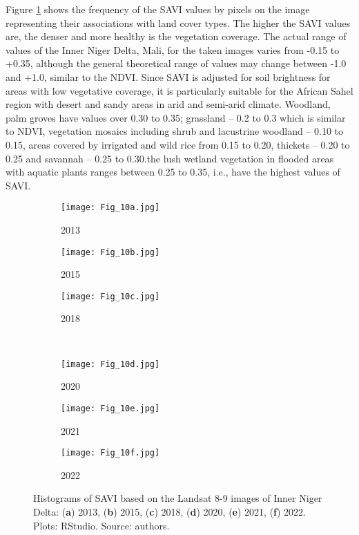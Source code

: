 \documentclass[12pt,a4paper,oneside]{article}
\def \newpar{\vspace{6pt}}
\begin{document}
\newpar Figure \ref{fig10} shows the frequency of the SAVI values by pixels on the image representing their associations with land cover types. The higher the SAVI values are, the denser and more healthy is the vegetation coverage. The actual range of values of the Inner Niger Delta, Mali, for the taken images varies from -0.15 to +0.35, although the general theoretical range of values may change between -1.0 and +1.0, similar to the NDVI. Since SAVI is adjusted for soil brightness for areas with low vegetative coverage, it is particularly suitable for the African Sahel region with desert and sandy areas in arid and semi-arid climate. Woodland, palm groves have values over 0.30 to 0.35; grassland -- 0.2 to 0.3 which is similar to NDVI, vegetation mosaics including shrub and lacustrine woodland -- 0.10 to 0.15, areas covered by irrigated and wild rice from 0.15 to 0.20,  thickets -- 0.20 to 0.25 and savannah -- 0.25 to 0.30.the lush wetland vegetation in flooded areas with aquatic plants ranges between 0.25 to 0.35, i.e., have the highest values of SAVI.

\begin{figure}[H]
	\begin{subfigure}[b]{.35\textwidth}
		\centering
			\texttt{[image: Fig\_10a.jpg]}
		\caption{2013}
	\end{subfigure}%
	\begin{subfigure}[b]{.35\textwidth}
		\centering
		\texttt{[image: Fig\_10b.jpg]}
		\caption{2015}
	\end{subfigure}%
	\begin{subfigure}[b]{.35\textwidth}
		\centering
		\texttt{[image: Fig\_10c.jpg]}
		\caption{2018}
	\end{subfigure}%
\\
\vfill \vspace{1mm}
	\begin{subfigure}[b]{.35\textwidth}
		\centering
			\texttt{[image: Fig\_10d.jpg]}
		\caption{2020}
	\end{subfigure}%
	\begin{subfigure}[b]{.35\textwidth}
		\centering
		\texttt{[image: Fig\_10e.jpg]}
		\caption{2021}
	\end{subfigure}%
	\begin{subfigure}[b]{.35\textwidth}
		\centering
		\texttt{[image: Fig\_10f.jpg]}
		\caption{2022}
	\end{subfigure}%
\vspace*{20pt}\caption{Histograms of SAVI based on the Landsat 8-9 images of Inner Niger Delta: (\textbf{a}) 2013, (\textbf{b}) 2015, (\textbf{c}) 2018, (\textbf{d}) 2020, (\textbf{e}) 2021, (\textbf{f}) 2022. Plots: RStudio. Source: authors.}\label{fig10}
\end{figure}
\end{document}
